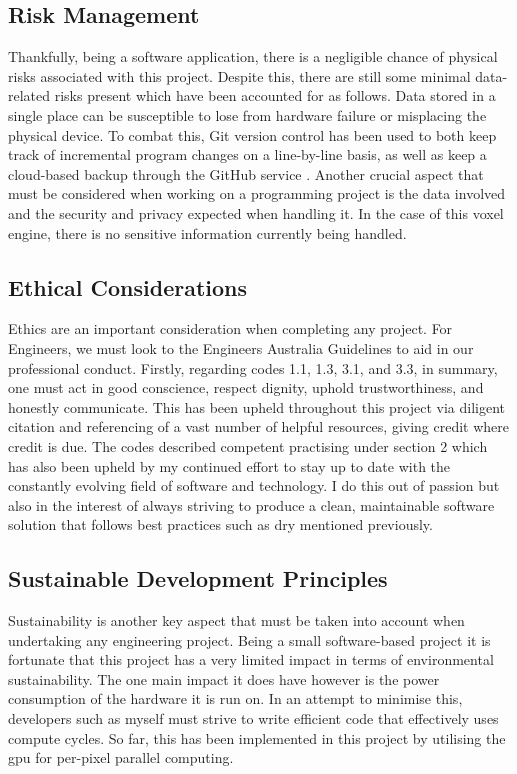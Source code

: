 \documentclass[titlepage]{article}
\begin{document}
\subsection{Risk Management}
Thankfully, being a software application, there is a negligible chance of physical risks associated with this project. Despite this, there are still some minimal data-related risks present which have been accounted for as follows. Data stored in a single place can be susceptible to lose from hardware failure or misplacing the physical device. To combat this, Git version control has been used to both keep track of incremental program changes on a line-by-line basis, as well as keep a cloud-based backup through the GitHub service \cite{github}. Another crucial aspect that must be considered when working on a programming project is the data involved and the security and privacy expected when handling it. In the case of this voxel engine, there is no sensitive information currently being handled.

\subsection{Ethical Considerations}
Ethics are an important consideration when completing any project. For Engineers, we must look to the Engineers Australia Guidelines \cite{ethics} to aid in our professional conduct. Firstly, regarding codes 1.1, 1.3, 3.1, and 3.3, in summary, one must act in good conscience, respect dignity, uphold trustworthiness, and honestly communicate. This has been upheld throughout this project via diligent citation and referencing of a vast number of helpful resources, giving credit where credit is due. The codes described competent practising under section 2 which has also been upheld by my continued effort to stay up to date with the constantly evolving field of software and technology. I do this out of passion but also in the interest of always striving to produce a clean, maintainable software solution that follows best practices such as \gls{dry} mentioned previously.

\subsection{Sustainable Development Principles}
Sustainability is another key aspect that must be taken into account when undertaking any engineering project. Being a small software-based project it is fortunate that this project has a very limited impact in terms of environmental sustainability. The one main impact it does have however is the power consumption of the hardware it is run on. In an attempt to minimise this, developers such as myself must strive to write efficient code that effectively uses compute cycles. So far, this has been implemented in this project by utilising the \gls{gpu} for per-pixel parallel computing.
\end{document}
